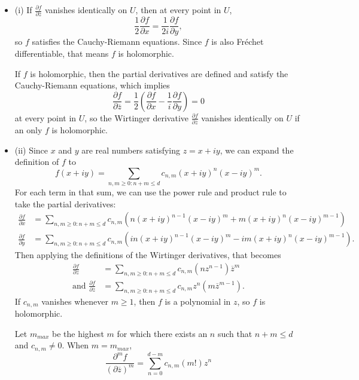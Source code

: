 \documentclass[12pt]{article}
\begin{document}
\begin{itemize}
    \item (i) If $\frac{\partial f}{\partial \overline{z}}$ vanishes identically on $U$, then at every point in $U$,
        \[ \frac{1}{2} \frac{\partial f}{\partial x} = \frac{1}{2i} \frac{\partial f}{\partial y}, \]
        so $f$ satisfies the Cauchy-Riemann equations. Since $f$ is also Fréchet differentiable, that means $f$ is holomorphic.
        \par
        If $f$ is holomorphic, then the partial derivatives are defined and satisfy the Cauchy-Riemann equations, which implies
        \[ \frac{\partial f}{\partial \overline{z}} = \frac{1}{2} \left( \frac{\partial f}{\partial x} - \frac{1}{i} \frac{\partial f}{\partial y} \right) = 0 \]
        at every point in $U$, so the Wirtinger derivative $ \frac{\partial f}{\partial \overline{z}} $ vanishes identically on $U$ if an only $f$ is holomorphic.
    \item (ii) Since $x$ and $y$ are real numbers satisfying $z=x+iy$, we can expand the definition of $f$ to
        \[ f(x+iy) = \sum_{n,m \geq 0: n+m \leq d} c_{n,m} (x+iy)^n (x-iy)^m. \]
        For each term in that sum, we can use the power rule and product rule to take the partial derivatives:
        \begin{align*}
            \frac{\partial f}{\partial x} &= \sum_{n,m \geq 0: n+m \leq d} c_{n,m} \left( n (x+iy)^{n-1} (x-iy)^m + m (x+iy)^n (x-iy)^{m-1} \right) \\
            \frac{\partial f}{\partial y} &= \sum_{n,m \geq 0: n+m \leq d} c_{n,m} \left( in (x+iy)^{n-1} (x-iy)^m - im (x+iy)^n (x-iy)^{m-1} \right).
        \end{align*}
        Then applying the definitions of the Wirtinger derivatives, that becomes
        \begin{align*}
            \frac{\partial f}{\partial z} &= \sum_{n,m \geq 0: n+m \leq d} c_{n,m}(nz^{n-1}) \overline{z}^m \\
            \text{and  } \frac{\partial f}{\partial \overline{z}} &= \sum_{n,m \geq 0: n+m \leq d} c_{n,m}z^n (m\overline{z}^{m-1}).
        \end{align*}
        If $c_{n,m}$ vanishes whenever $m \geq 1$, then $f$ is a polynomial in $z$, so $f$ is holomorphic.
        \par
        Let $m_{max}$ be the highest $m$ for which there exists an $n$ such that $n+m \leq d$ and $c_{n,m} \neq 0$. When $m=m_{max}$,
        \[ \frac{\partial^m f}{(\partial \overline{z})^m} = \sum_{n=0}^{d-m} c_{n,m} (m!) z^n \]

\end{itemize}
\end{document}
